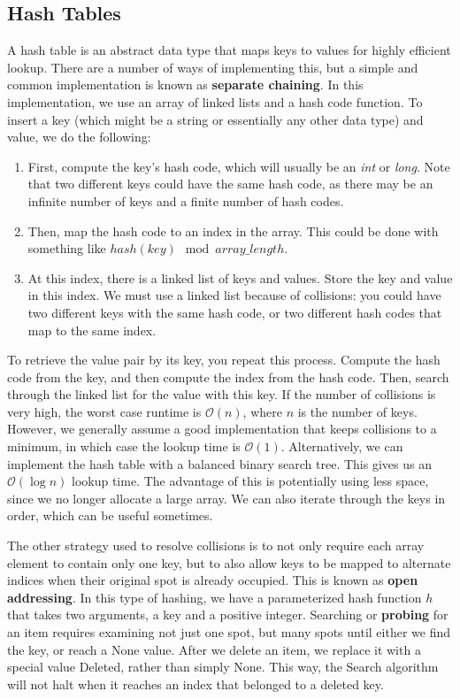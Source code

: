 \documentclass{article}
\newcommand{\bigO}{\mathcal{O}}
\begin{document}
    \subsection{Hash Tables}
    A hash table is an abstract data type that maps keys to values for highly efficient lookup. There are a number of ways of implementing this, but a simple and common implementation is known as \textbf{separate chaining}. In this implementation, we use an array of linked lists and a hash code function. To insert a key (which might be a string or essentially any other data type) and value, we do the following: 
    \begin{enumerate}
        \item 
        First, compute the key's hash code, which will usually be an \textit{int} or \textit{long}. Note that two different keys could have the same hash code, as there may be an infinite number of keys and a finite number of hash codes.
        \item
        Then, map the hash code to an index in the array. This could be done with something like $hash(key)\mod array\_length$. 
        \item
        At this index, there is a linked list of keys and values. Store the key and value in this index. We must use a linked list because of collisions: you could have two different keys with the same hash code, or two different hash codes that map to the same index.
    \end{enumerate}
    To retrieve the value pair by its key, you repeat this process. Compute the hash code from the key, and then compute the index from the hash code. Then, search through the linked list for the value with this key. If the number of collisions is very high, the worst case runtime is $\bigO(n)$, where $n$ is the number of keys. However, we generally assume a good implementation that keeps collisions to a minimum, in which case the lookup time is $\bigO(1)$. Alternatively, we can implement the hash table with a balanced binary search tree. This gives us an $\bigO(\log n)$ lookup time. The advantage of this is potentially using less space, since we no longer allocate a large array. We can also iterate through the keys in order, which can be useful sometimes.

    The other strategy used to resolve collisions is to not only require each array element to contain only one key, but to also allow keys to be mapped to alternate indices when their original spot is already occupied. This is known as \textbf{open addressing}. In this type of hashing, we have a parameterized hash function $h$ that takes two arguments, a key and a positive integer. Searching or \textbf{probing} for an item requires examining not just one spot, but many spots until either we find the key, or reach a None value. After we delete an item, we replace it with a special value Deleted, rather than simply None. This way, the Search algorithm will not halt when it reaches an index that belonged to a deleted key.
    
\end{document}
